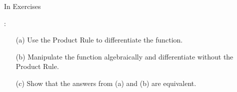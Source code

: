 {\noindent In Exercises}
{:
\begin{enumerate}
\item[(a)] Use the Product Rule to differentiate the function.
\item[(b)] Manipulate the function algebraically and differentiate without the Product Rule.
\item[(c)] Show that the answers from (a) and (b) are equivalent.
\end{enumerate}
}
